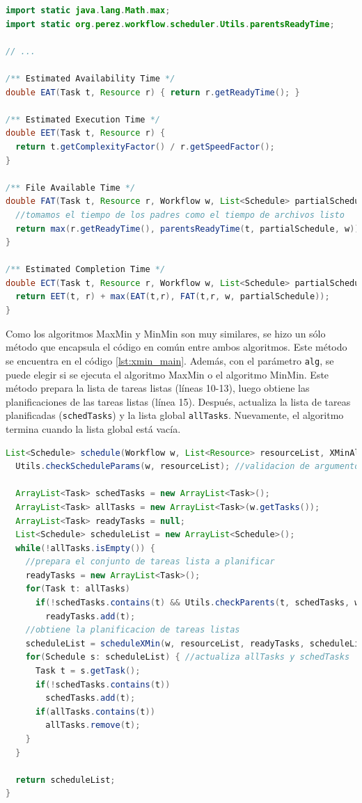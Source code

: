 \begin{lstlisting}[language=java,label={code:xmin_defs},caption={Definiciones comunes para MaxMin y MinMin.},float]
import static java.lang.Math.max; 
import static org.perez.workflow.scheduler.Utils.parentsReadyTime;

// ...

/** Estimated Availability Time */
double EAT(Task t, Resource r) { return r.getReadyTime(); }

/** Estimated Execution Time */
double EET(Task t, Resource r) { 
  return t.getComplexityFactor() / r.getSpeedFactor(); 
}

/** File Available Time */
double FAT(Task t, Resource r, Workflow w, List<Schedule> partialSchedule) {
  //tomamos el tiempo de los padres como el tiempo de archivos listo
  return max(r.getReadyTime(), parentsReadyTime(t, partialSchedule, w));
}

/** Estimated Completion Time */
double ECT(Task t, Resource r, Workflow w, List<Schedule> partialSchedule) {
  return EET(t, r) + max(EAT(t,r), FAT(t,r, w, partialSchedule));
}
\end{lstlisting}

Como los algoritmos MaxMin y MinMin son muy similares, se hizo un sólo método que encapsula el código en común entre ambos algoritmos. Este método se encuentra en el código \ref{lst:xmin_main}. Además, con el parámetro \texttt{alg}, se puede elegir si se ejecuta el algoritmo MaxMin o el algoritmo MinMin. Este método prepara la lista de tareas listas (líneas 10-13), luego obtiene las planificaciones de las tareas listas (línea 15). Después, actualiza la lista de tareas planificadas (\texttt{schedTasks}) y la lista global \texttt{allTasks}. Nuevamente, el algoritmo termina cuando la lista global está vacía.

\begin{lstlisting}[language=java,label={lst:xmin_main},caption={Método principal para los algoritmos MaxMin y MinMin.},float]
List<Schedule> schedule(Workflow w, List<Resource> resourceList, XMinAlgorithm alg) {
  Utils.checkScheduleParams(w, resourceList); //validacion de argumentos

  ArrayList<Task> schedTasks = new ArrayList<Task>();
  ArrayList<Task> allTasks = new ArrayList<Task>(w.getTasks());
  ArrayList<Task> readyTasks = null;
  List<Schedule> scheduleList = new ArrayList<Schedule>();
  while(!allTasks.isEmpty()) {
    //prepara el conjunto de tareas lista a planificar
    readyTasks = new ArrayList<Task>();
    for(Task t: allTasks)
      if(!schedTasks.contains(t) && Utils.checkParents(t, schedTasks, w))
        readyTasks.add(t);
    //obtiene la planificacion de tareas listas
    scheduleList = scheduleXMin(w, resourceList, readyTasks, scheduleList, alg);
    for(Schedule s: scheduleList) { //actualiza allTasks y schedTasks
      Task t = s.getTask();
      if(!schedTasks.contains(t))
        schedTasks.add(t);
      if(allTasks.contains(t))
        allTasks.remove(t);
    }
  }

  return scheduleList;
}
\end{lstlisting}

